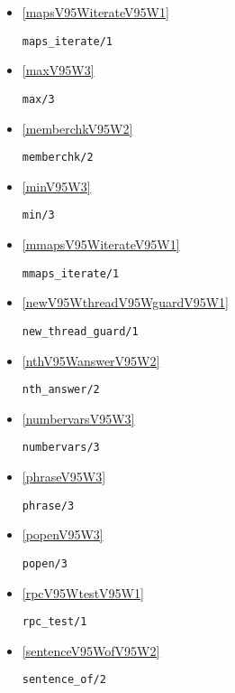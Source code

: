 \begin{itemize}
\item \ref{mapsV95WiterateV95W1} 
\begin{verbatim}
maps_iterate/1
\end{verbatim}

\item \ref{maxV95W3} 
\begin{verbatim}
max/3
\end{verbatim}

\item \ref{memberchkV95W2} 
\begin{verbatim}
memberchk/2
\end{verbatim}

\item \ref{minV95W3} 
\begin{verbatim}
min/3
\end{verbatim}

\item \ref{mmapsV95WiterateV95W1} 
\begin{verbatim}
mmaps_iterate/1
\end{verbatim}

\item \ref{newV95WthreadV95WguardV95W1} 
\begin{verbatim}
new_thread_guard/1
\end{verbatim}

\item \ref{nthV95WanswerV95W2} 
\begin{verbatim}
nth_answer/2
\end{verbatim}

\item \ref{numbervarsV95W3} 
\begin{verbatim}
numbervars/3
\end{verbatim}

\item \ref{phraseV95W3} 
\begin{verbatim}
phrase/3
\end{verbatim}

\item \ref{popenV95W3} 
\begin{verbatim}
popen/3
\end{verbatim}

\item \ref{rpcV95WtestV95W1} 
\begin{verbatim}
rpc_test/1
\end{verbatim}

\item \ref{sentenceV95WofV95W2} 
\begin{verbatim}
sentence_of/2
\end{verbatim}


\end{itemize}
